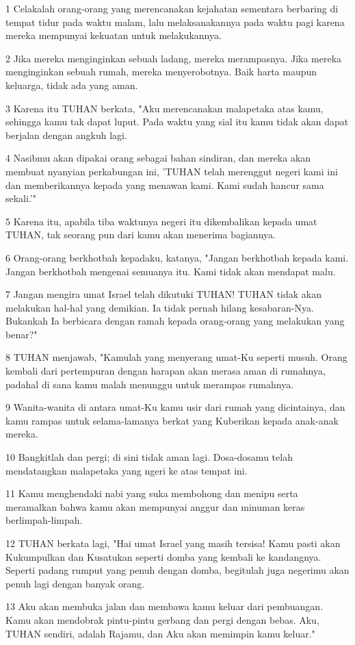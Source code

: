 \par 1 Celakalah orang-orang yang merencanakan kejahatan sementara berbaring di tempat tidur pada waktu malam, lalu melaksanakannya pada waktu pagi karena mereka mempunyai kekuatan untuk melakukannya.
\par 2 Jika mereka menginginkan sebuah ladang, mereka merampasnya. Jika mereka menginginkan sebuah rumah, mereka menyerobotnya. Baik harta maupun keluarga, tidak ada yang aman.
\par 3 Karena itu TUHAN berkata, "Aku merencanakan malapetaka atas kamu, sehingga kamu tak dapat luput. Pada waktu yang sial itu kamu tidak akan dapat berjalan dengan angkuh lagi.
\par 4 Nasibmu akan dipakai orang sebagai bahan sindiran, dan mereka akan membuat nyanyian perkabungan ini, 'TUHAN telah merenggut negeri kami ini dan memberikannya kepada yang menawan kami. Kami sudah hancur sama sekali.'"
\par 5 Karena itu, apabila tiba waktunya negeri itu dikembalikan kepada umat TUHAN, tak seorang pun dari kamu akan menerima bagiannya.
\par 6 Orang-orang berkhotbah kepadaku, katanya, "Jangan berkhotbah kepada kami. Jangan berkhotbah mengenai semuanya itu. Kami tidak akan mendapat malu.
\par 7 Jangan mengira umat Israel telah dikutuki TUHAN! TUHAN tidak akan melakukan hal-hal yang demikian. Ia tidak pernah hilang kesabaran-Nya. Bukankah Ia berbicara dengan ramah kepada orang-orang yang melakukan yang benar?"
\par 8 TUHAN menjawab, "Kamulah yang menyerang umat-Ku seperti musuh. Orang kembali dari pertempuran dengan harapan akan merasa aman di rumahnya, padahal di sana kamu malah menunggu untuk merampas rumahnya.
\par 9 Wanita-wanita di antara umat-Ku kamu usir dari rumah yang dicintainya, dan kamu rampas untuk selama-lamanya berkat yang Kuberikan kepada anak-anak mereka.
\par 10 Bangkitlah dan pergi; di sini tidak aman lagi. Dosa-dosamu telah mendatangkan malapetaka yang ngeri ke atas tempat ini.
\par 11 Kamu menghendaki nabi yang suka membohong dan menipu serta meramalkan bahwa kamu akan mempunyai anggur dan minuman keras berlimpah-limpah.
\par 12 TUHAN berkata lagi, "Hai umat Israel yang masih tersisa! Kamu pasti akan Kukumpulkan dan Kusatukan seperti domba yang kembali ke kandangnya. Seperti padang rumput yang penuh dengan domba, begitulah juga negerimu akan penuh lagi dengan banyak orang.
\par 13 Aku akan membuka jalan dan membawa kamu keluar dari pembuangan. Kamu akan mendobrak pintu-pintu gerbang dan pergi dengan bebas. Aku, TUHAN sendiri, adalah Rajamu, dan Aku akan memimpin kamu keluar."

